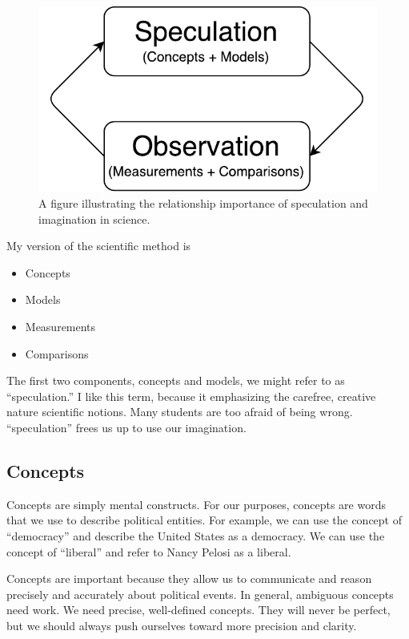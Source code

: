 \documentclass[]{book}
\providecommand{\tightlist}{%
  \setlength{\itemsep}{0pt}\setlength{\parskip}{0pt}}
\theoremstyle{definition}
\theoremstyle{definition}
\theoremstyle{definition}
\theoremstyle{remark}
\begin{document}
\begin{figure}
\centering
\includegraphics{diagrams/speculation-observation.pdf}
\caption{A figure illustrating the relationship importance of
speculation and imagination in science.}
\end{figure}

My version of the scientific method is

\begin{itemize}
\tightlist
\item
  Concepts
\item
  Models
\item
  Measurements
\item
  Comparisons
\end{itemize}

The first two components, concepts and models, we might refer to as
``speculation.'' I like this term, because it emphasizing the carefree,
creative nature scientific notions. Many students are too afraid of
being wrong. ``speculation'' frees us up to use our imagination.

\subsection{Concepts}\label{concepts}

Concepts are simply mental constructs. For our purposes, concepts are
words that we use to describe political entities. For example, we can
use the concept of ``democracy'' and describe the United States as a
democracy. We can use the concept of ``liberal'' and refer to Nancy
Pelosi as a liberal.

Concepts are important because they allow us to communicate and reason
precisely and accurately about political events. In general, ambiguous
concepts need work. We need precise, well-defined concepts. They will
never be perfect, but we should always push ourselves toward more
precision and clarity.
\end{document}
